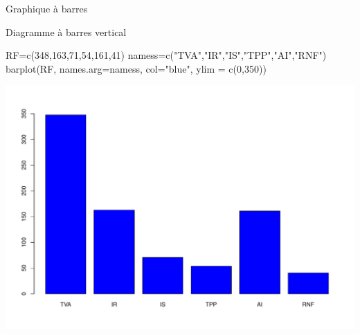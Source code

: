 \documentclass[
  8pt,
  ignorenonframetext,
]{beamer}
\newenvironment{Shaded}{\begin{snugshade}}{\end{snugshade}}
\newcommand{\AttributeTok}[1]{\textcolor[rgb]{0.77,0.63,0.00}{#1}}
\newcommand{\DecValTok}[1]{\textcolor[rgb]{0.00,0.00,0.81}{#1}}
\newcommand{\FunctionTok}[1]{\textcolor[rgb]{0.00,0.00,0.00}{#1}}
\newcommand{\NormalTok}[1]{#1}
\newcommand{\OtherTok}[1]{\textcolor[rgb]{0.56,0.35,0.01}{#1}}
\newcommand{\StringTok}[1]{\textcolor[rgb]{0.31,0.60,0.02}{#1}}
\begin{document}
\begin{frame}[fragile]{Graphique à barres}
\protect\hypertarget{graphique-uxe0-barres}{}
\begin{block}{Diagramme à barres vertical}
\protect\hypertarget{diagramme-uxe0-barres-vertical}{}
\begin{Shaded}
\begin{Highlighting}[]
\NormalTok{RF}\OtherTok{=}\FunctionTok{c}\NormalTok{(}\DecValTok{348}\NormalTok{,}\DecValTok{163}\NormalTok{,}\DecValTok{71}\NormalTok{,}\DecValTok{54}\NormalTok{,}\DecValTok{161}\NormalTok{,}\DecValTok{41}\NormalTok{)}
\NormalTok{namess}\OtherTok{=}\FunctionTok{c}\NormalTok{(}\StringTok{"TVA"}\NormalTok{,}\StringTok{"IR"}\NormalTok{,}\StringTok{"IS"}\NormalTok{,}\StringTok{"TPP"}\NormalTok{,}\StringTok{"AI"}\NormalTok{,}\StringTok{"RNF"}\NormalTok{)}
\FunctionTok{barplot}\NormalTok{(RF, }\AttributeTok{names.arg=}\NormalTok{namess, }\AttributeTok{col=}\StringTok{"blue"}\NormalTok{, }\AttributeTok{ylim =} \FunctionTok{c}\NormalTok{(}\DecValTok{0}\NormalTok{,}\DecValTok{350}\NormalTok{))}
\end{Highlighting}
\end{Shaded}

\begin{center}\includegraphics[width=0.8\linewidth]{Chap2_R_files/figure-beamer/unnamed-chunk-14-1} \end{center}
\end{block}
\end{frame}
\end{document}
